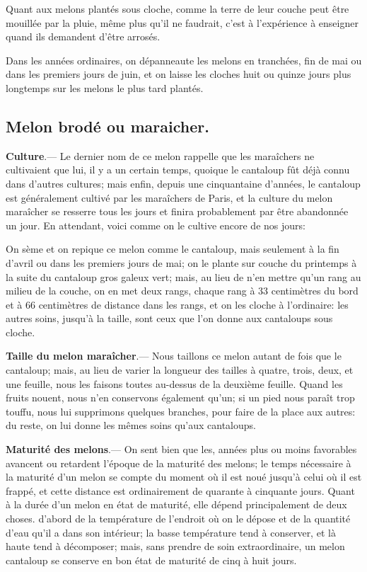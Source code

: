 \documentclass[10pt,a4paper]{book}
\begin{document}
Quant aux melons plantés sous cloche, comme la terre de leur couche peut être mouillée par la pluie, même plus qu'il ne faudrait, c'est à l'expérience à enseigner quand ils demandent d'être arrosés.

Dans les années ordinaires, on dépanneaute les melons en tranchées, fin de mai ou dans les premiers jours de juin, et on laisse les cloches huit ou quinze jours plus longtemps sur les melons le plus tard plantés.

\subsection{Melon brodé ou maraicher.}

\textbf{Culture}.--- Le dernier nom de ce melon rappelle que les maraîchers ne cultivaient que lui, il y a un certain temps, quoique le cantaloup fût déjà connu dans d'autres cultures; mais enfin, depuis une cinquantaine d'années, le cantaloup est généralement cultivé par les maraîchers de Paris, et la culture du melon maraîcher se resserre tous les jours et finira probablement par être abandonnée un jour. En attendant, voici comme on le cultive encore de nos jours:

On sème et on repique ce melon comme le cantaloup, mais seulement à la fin d'avril ou dans les premiers jours de mai; on le plante sur couche du printemps à la suite du cantaloup gros galeux vert; mais, au lieu de n'en mettre qu'un rang au milieu de la couche, on en met deux rangs, chaque rang à 33 centimètres du bord et à 66 centimètres de distance dans les rangs, et on les cloche à l'ordinaire: les autres soins, jusqu'à la taille, sont ceux que l'on donne aux cantaloups sous cloche.

\textbf{Taille du melon maraîcher}.--- Nous taillons ce melon autant de fois que le cantaloup; mais, au lieu de varier la longueur des tailles à quatre, trois, deux, et une feuille, nous les faisons toutes au-dessus de la deuxième feuille. Quand les fruits nouent, nous n'en conservons également qu'un; si un pied nous paraît trop touffu, nous lui supprimons quelques branches, pour faire de la place aux autres: du reste, on lui donne les mêmes soins qu'aux cantaloups.

\textbf{Maturité des melons}.--- On sent bien que les, années plus ou moins favorables avancent ou retardent l'époque de la maturité des melons; le temps nécessaire à la maturité d'un melon se compte du moment où il est noué jusqu'à celui où il est frappé, et cette distance est ordinairement de quarante à cinquante jours. Quant à la durée d'un melon en état de maturité, elle dépend principalement de deux choses. d'abord de la température de l'endroit où on le dépose et de la quantité d'eau qu'il a dans son intérieur; la basse température tend à conserver, et là haute tend à décomposer; mais, sans prendre de soin extraordinaire, un melon cantaloup se conserve en bon état de maturité de cinq à huit jours.
\end{document}
